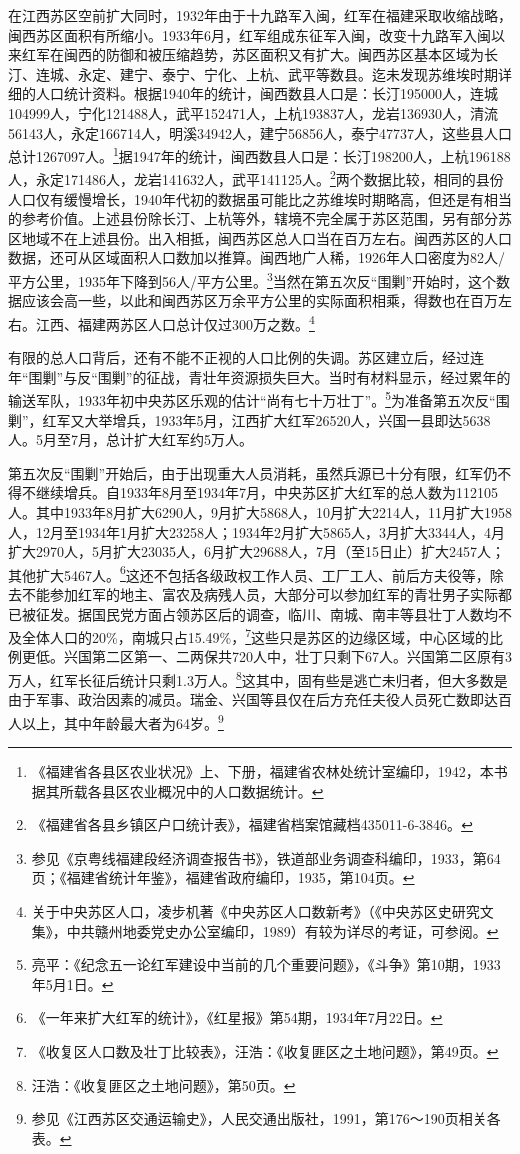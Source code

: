在江西苏区空前扩大同时，1932年由于十九路军入闽，红军在福建采取收缩战略，闽西苏区面积有所缩小。1933年6月，红军组成东征军入闽，改变十九路军入闽以来红军在闽西的防御和被压缩趋势，苏区面积又有扩大。闽西苏区基本区域为长汀、连城、永定、建宁、泰宁、宁化、上杭、武平等数县。迄未发现苏维埃时期详细的人口统计资料。根据1940年的统计，闽西数县人口是：长汀195000人，连城104999人，宁化121488人，武平152471人，上杭193837人，龙岩136930人，清流56143人，永定166714人，明溪34942人，建宁56856人，泰宁47737人，这些县人口总计1267097人。\footnote{《福建省各县区农业状况》上、下册，福建省农林处统计室编印，1942，本书据其所载各县区农业概况中的人口数据统计。}据1947年的统计，闽西数县人口是：长汀198200人，上杭196188人，永定171486人，龙岩141632人，武平141125人。\footnote{《福建省各县乡镇区户口统计表》，福建省档案馆藏档435011-6-3846。}两个数据比较，相同的县份人口仅有缓慢增长，1940年代初的数据虽可能比之苏维埃时期略高，但还是有相当的参考价值。上述县份除长汀、上杭等外，辖境不完全属于苏区范围，另有部分苏区地域不在上述县份。出入相抵，闽西苏区总人口当在百万左右。闽西苏区的人口数据，还可从区域面积人口数加以推算。闽西地广人稀，1926年人口密度为82人/平方公里，1935年下降到56人/平方公里。\footnote{参见《京粤线福建段经济调查报告书》，铁道部业务调查科编印，1933，第64页；《福建省统计年鉴》，福建省政府编印，1935，第104页。}当然在第五次反“围剿”开始时，这个数据应该会高一些，以此和闽西苏区万余平方公里的实际面积相乘，得数也在百万左右。江西、福建两苏区人口总计仅过300万之数。\footnote{关于中央苏区人口，凌步机著《中央苏区人口数新考》（《中央苏区史研究文集》，中共赣州地委党史办公室编印，1989）有较为详尽的考证，可参阅。}


有限的总人口背后，还有不能不正视的人口比例的失调。苏区建立后，经过连年“围剿”与反“围剿”的征战，青壮年资源损失巨大。当时有材料显示，经过累年的输送军队，1933年初中央苏区乐观的估计“尚有七十万壮丁”。\footnote{亮平：《纪念五一论红军建设中当前的几个重要问题》，《斗争》第10期，1933年5月1日。}为准备第五次反“围剿”，红军又大举增兵，1933年5月，江西扩大红军26520人，兴国一县即达5638人。5月至7月，总计扩大红军约5万人。


第五次反“围剿”开始后，由于出现重大人员消耗，虽然兵源已十分有限，红军仍不得不继续增兵。自1933年8月至1934年7月，中央苏区扩大红军的总人数为112105人。其中1933年8月扩大6290人，9月扩大5868人，10月扩大2214人，11月扩大1958人，12月至1934年1月扩大23258人；1934年2月扩大5865人，3月扩大3344人，4月扩大2970人，5月扩大23035人，6月扩大29688人，7月（至15日止）扩大2457人；其他扩大5467人。\footnote{《一年来扩大红军的统计》，《红星报》第54期，1934年7月22日。}这还不包括各级政权工作人员、工厂工人、前后方夫役等，除去不能参加红军的地主、富农及病残人员，大部分可以参加红军的青壮男子实际都已被征发。据国民党方面占领苏区后的调查，临川、南城、南丰等县壮丁人数均不及全体人口的20\%，南城只占15.49\%，\footnote{《收复区人口数及壮丁比较表》，汪浩：《收复匪区之土地问题》，第49页。}这些只是苏区的边缘区域，中心区域的比例更低。兴国第二区第一、二两保共720人中，壮丁只剩下67人。兴国第二区原有3万人，红军长征后统计只剩1.3万人。\footnote{汪浩：《收复匪区之土地问题》，第50页。}这其中，固有些是逃亡未归者，但大多数是由于军事、政治因素的减员。瑞金、兴国等县仅在后方充任夫役人员死亡数即达百人以上，其中年龄最大者为64岁。\footnote{参见《江西苏区交通运输史》，人民交通出版社，1991，第176～190页相关各表。}


